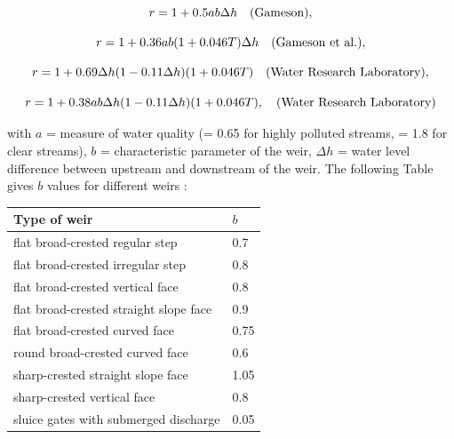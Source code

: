 \begin{equation}
  r = 1 + 0.5 a b \Delta h \quad \rm{(Gameson)},
\end{equation}

\begin{equation}
  r = 1+ 0.36 a b (1+0.046 T) \Delta h \quad \rm{(Gameson~et~al.)},
\end{equation}

\begin{equation}
  r = 1 + 0.69 \Delta h (1 - 0.11 \Delta h) (1 +0.046 T) \quad \rm{(Water~Research~Laboratory)},
\end{equation}

\begin{equation}
  r = 1 + 0.38 a b  \Delta h (1 - 0.11 \Delta h) (1 +0.046 T),
  \quad \rm{(Water~Research~Laboratory)}
\end{equation}

with $a$ = measure of water quality (= 0.65 for highly polluted streams,
= 1.8 for clear streams),
$b$ = characteristic parameter of the weir,
$\Delta h$ = water level difference between upstream and downstream of the weir.
The following Table gives $b$ values for different weirs \cite{mccutcheon_wq_1989}:\\

\begin{table}[H]
 			\centering
\begin{tabular}{p{3.0in}p{3.0in}}
\hline
\multicolumn{1}{|p{3.0in}}{Type of weir} & 
\multicolumn{1}{|p{3.0in}|}{$b$} \\
\hline
\multicolumn{1}{|p{3.0in}}{flat broad-crested regular step} & 
\multicolumn{1}{|p{3.0in}|}{0.7} \\
\hline
\multicolumn{1}{|p{3.0in}}{flat broad-crested irregular step} & 
\multicolumn{1}{|p{3.0in}|}{0.8} \\
\hline
\multicolumn{1}{|p{3.0in}}{flat broad-crested vertical face} & 
\multicolumn{1}{|p{3.0in}|}{0.8} \\
\hline
\multicolumn{1}{|p{3.0in}}{flat broad-crested straight slope face} & 
\multicolumn{1}{|p{3.0in}|}{0.9} \\
\hline
\multicolumn{1}{|p{3.0in}}{flat broad-crested curved face} & 
\multicolumn{1}{|p{3.0in}|}{0.75} \\
\hline
\multicolumn{1}{|p{3.0in}}{round broad-crested curved face} & 
\multicolumn{1}{|p{3.0in}|}{0.6} \\
\hline
\multicolumn{1}{|p{3.0in}}{sharp-crested straight slope face} & 
\multicolumn{1}{|p{3.0in}|}{1.05} \\
\hline
\multicolumn{1}{|p{3.0in}}{sharp-crested vertical face} & 
\multicolumn{1}{|p{3.0in}|}{0.8} \\
\hline
\multicolumn{1}{|p{3.0in}}{sluice gates with submerged discharge} & 
\multicolumn{1}{|p{3.0in}|}{0.05} \\
\hline

\end{tabular}
\end{table}

